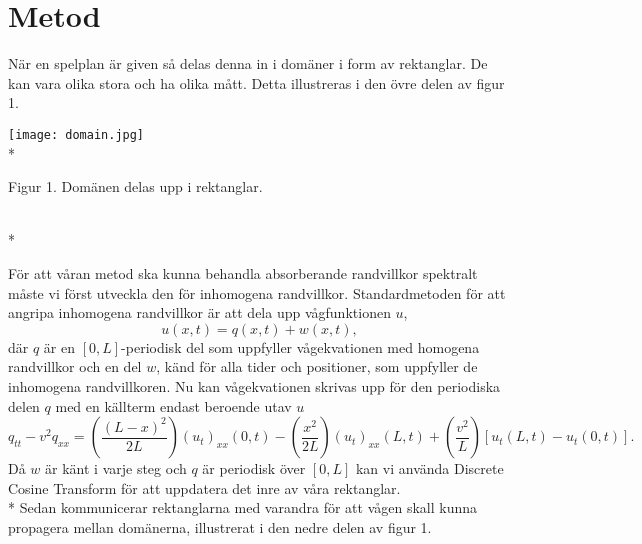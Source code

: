 \section*{Metod}
När en spelplan är given så delas denna in i domäner i form av rektanglar. De kan vara olika stora och ha olika mått. Detta illustreras i den övre delen av figur 1. 
\newline
\newline
\begin{minipage}{\linewidth}
  \begin{center}
    \texttt{[image: domain.jpg]}\\*
    \caption{Figur 1. Domänen delas upp i rektanglar\cite{rect_decomp}.}\\*
  \end{center}
\end{minipage}
\newline
\newline
För att våran metod ska kunna behandla absorberande randvillkor spektralt måste vi först utveckla den för inhomogena randvillkor. Standardmetoden för att angripa inhomogena randvillkor är att dela upp vågfunktionen $u$,
\begin{equation}
u(x,t) = q(x,t) + w(x,t),
\end{equation}
där $q$ är en $[0,L]$-periodisk del som uppfyller vågekvationen med homogena randvillkor och en del $w$, känd för alla tider och positioner, som uppfyller de inhomogena randvillkoren. Nu kan vågekvationen skrivas upp för den periodiska delen $q$ med en källterm endast beroende utav $u$
\begin{equation} \label{eq:abcstep}
q_{tt} - v^{2}q_{xx} = \left(\frac{(L-x)^{2}}{2L}\right)(u_{t})_{xx}(0,t) - \left(\frac{x^{2}}{2L}\right)(u_{t})_{xx}(L,t) + \left(\frac{v^{2}}{L}\right)[u_{t}(L,t) - u_{t}(0,t)].
\end{equation}
Då $w$ är känt i varje steg och $q$ är periodisk över $[0,L]$ kan vi använda Discrete Cosine Transform för att uppdatera det inre av våra rektanglar.\\*
Sedan kommunicerar rektanglarna med varandra för att vågen skall kunna propagera mellan domänerna, illustrerat i den nedre delen av figur 1.

